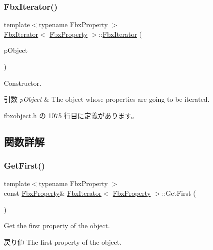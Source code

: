 \subsubsection{\texorpdfstring{Fbx\+Iterator()}{FbxIterator()}}
{\footnotesize\ttfamily template$<$typename Fbx\+Property $>$ \\
\hyperlink{class_fbx_iterator}{Fbx\+Iterator}$<$ \hyperlink{class_fbx_property}{Fbx\+Property} $>$\+::\hyperlink{class_fbx_iterator}{Fbx\+Iterator} (\begin{DoxyParamCaption}\item[{const \hyperlink{class_fbx_object}{Fbx\+Object} $\ast$}]{p\+Object }\end{DoxyParamCaption})\hspace{0.3cm}{\ttfamily [inline]}}

Constructor. 
\begin{DoxyParams}{引数}
{\em p\+Object} & The object whose properties are going to be iterated. \\
\hline
\end{DoxyParams}


 fbxobject.\+h の 1075 行目に定義があります。



\subsection{関数詳解}
\mbox{\label{class_fbx_iterator_a3ebfa1d0238b2b13c9163a26c0687cb2}} 
\subsubsection{\texorpdfstring{Get\+First()}{GetFirst()}}
{\footnotesize\ttfamily template$<$typename Fbx\+Property $>$ \\
const \hyperlink{class_fbx_property}{Fbx\+Property}\& \hyperlink{class_fbx_iterator}{Fbx\+Iterator}$<$ \hyperlink{class_fbx_property}{Fbx\+Property} $>$\+::Get\+First (\begin{DoxyParamCaption}{ }\end{DoxyParamCaption})\hspace{0.3cm}{\ttfamily [inline]}}

Get the first property of the object. \begin{DoxyReturn}{戻り値}
The first property of the object. 
\end{DoxyReturn}


